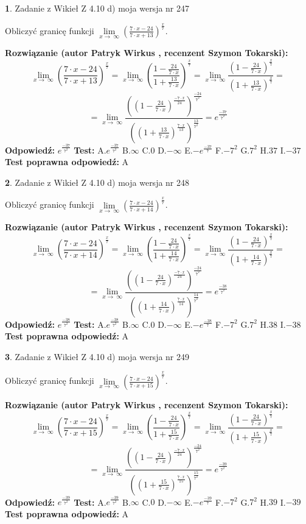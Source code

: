 \documentclass[12pt, a4paper]{article}
\theoremstyle{definition} %
\newtheorem{zad}{}
\newcommand{\zadStart}[1]{\begin{zad}#1\newline}
\newcommand{\zadStop}{\end{zad}}
\newcommand{\rozwStart}[2]{\noindent \textbf{Rozwiązanie (autor #1 , recenzent #2): }\newline}
\newcommand{\rozwStop}{\newline}
\newcommand{\odpStart}{\noindent \textbf{Odpowiedź:}\newline}
\newcommand{\odpStop}{\newline}
\newcommand{\testStart}{\noindent \textbf{Test:}\newline}
\newcommand{\testStop}{\newline}
\newcommand{\kluczStart}{\noindent \textbf{Test poprawna odpowiedź:}\newline}
\newcommand{\kluczStop}{\newline}
\begin{document}
\zadStart{Zadanie z Wikieł Z 4.10 d) moja wersja nr 247}


Obliczyć granicę funkcji  $\lim\limits_{x\to\ \infty}(\frac{7\cdot x-24}{7\cdot x+13})^{\frac{x}{7}}$.
\zadStop
\rozwStart{Patryk Wirkus}{Szymon Tokarski}
$$\lim\limits_{x\to\ \infty}(\frac{7\cdot x-24}{7\cdot x+13})^{\frac{x}{7}} = \lim\limits_{x\to\ \infty}(\frac{1-\frac{24}{7\cdot x}}{1+\frac{13}{7\cdot x}})^{\frac{x}{7}}=\lim\limits_{x\to\ \infty}\frac{(1-\frac{24}{7\cdot x})^{\frac{x}{7}}}{(1+\frac{13}{7\cdot x})^{\frac{x}{7}}}=$$
$$=\lim\limits_{x\to\ \infty}\frac{((1-\frac{24}{7\cdot x})^{\frac{-7\cdot x}{24}})^{\frac{-24}{7^{2}}}}{((1+\frac{13}{7\cdot x})^{\frac{7\cdot x}{13}})^{\frac{13}{7^{2}}}}=e^{\frac{-37}{7^{2}}}$$
\rozwStop
\odpStart
$e^{\frac{-37}{7^{2}}}$
\odpStop
\testStart
A.$e^{\frac{-37}{7^{2}}}$ B.$\infty$ C.$0$ D.$-\infty$ E.$-e^{\frac{-37}{7}}$
F.$-7^{2}$ G.$7^{2}$
H.$37$
I.$-37$
\testStop
\kluczStart
A
\kluczStop



\zadStart{Zadanie z Wikieł Z 4.10 d) moja wersja nr 248}


Obliczyć granicę funkcji  $\lim\limits_{x\to\ \infty}(\frac{7\cdot x-24}{7\cdot x+14})^{\frac{x}{7}}$.
\zadStop
\rozwStart{Patryk Wirkus}{Szymon Tokarski}
$$\lim\limits_{x\to\ \infty}(\frac{7\cdot x-24}{7\cdot x+14})^{\frac{x}{7}} = \lim\limits_{x\to\ \infty}(\frac{1-\frac{24}{7\cdot x}}{1+\frac{14}{7\cdot x}})^{\frac{x}{7}}=\lim\limits_{x\to\ \infty}\frac{(1-\frac{24}{7\cdot x})^{\frac{x}{7}}}{(1+\frac{14}{7\cdot x})^{\frac{x}{7}}}=$$
$$=\lim\limits_{x\to\ \infty}\frac{((1-\frac{24}{7\cdot x})^{\frac{-7\cdot x}{24}})^{\frac{-24}{7^{2}}}}{((1+\frac{14}{7\cdot x})^{\frac{7\cdot x}{14}})^{\frac{14}{7^{2}}}}=e^{\frac{-38}{7^{2}}}$$
\rozwStop
\odpStart
$e^{\frac{-38}{7^{2}}}$
\odpStop
\testStart
A.$e^{\frac{-38}{7^{2}}}$ B.$\infty$ C.$0$ D.$-\infty$ E.$-e^{\frac{-38}{7}}$
F.$-7^{2}$ G.$7^{2}$
H.$38$
I.$-38$
\testStop
\kluczStart
A
\kluczStop



\zadStart{Zadanie z Wikieł Z 4.10 d) moja wersja nr 249}


Obliczyć granicę funkcji  $\lim\limits_{x\to\ \infty}(\frac{7\cdot x-24}{7\cdot x+15})^{\frac{x}{7}}$.
\zadStop
\rozwStart{Patryk Wirkus}{Szymon Tokarski}
$$\lim\limits_{x\to\ \infty}(\frac{7\cdot x-24}{7\cdot x+15})^{\frac{x}{7}} = \lim\limits_{x\to\ \infty}(\frac{1-\frac{24}{7\cdot x}}{1+\frac{15}{7\cdot x}})^{\frac{x}{7}}=\lim\limits_{x\to\ \infty}\frac{(1-\frac{24}{7\cdot x})^{\frac{x}{7}}}{(1+\frac{15}{7\cdot x})^{\frac{x}{7}}}=$$
$$=\lim\limits_{x\to\ \infty}\frac{((1-\frac{24}{7\cdot x})^{\frac{-7\cdot x}{24}})^{\frac{-24}{7^{2}}}}{((1+\frac{15}{7\cdot x})^{\frac{7\cdot x}{15}})^{\frac{15}{7^{2}}}}=e^{\frac{-39}{7^{2}}}$$
\rozwStop
\odpStart
$e^{\frac{-39}{7^{2}}}$
\odpStop
\testStart
A.$e^{\frac{-39}{7^{2}}}$ B.$\infty$ C.$0$ D.$-\infty$ E.$-e^{\frac{-39}{7}}$
F.$-7^{2}$ G.$7^{2}$
H.$39$
I.$-39$
\testStop
\kluczStart
A
\kluczStop
\end{document}
